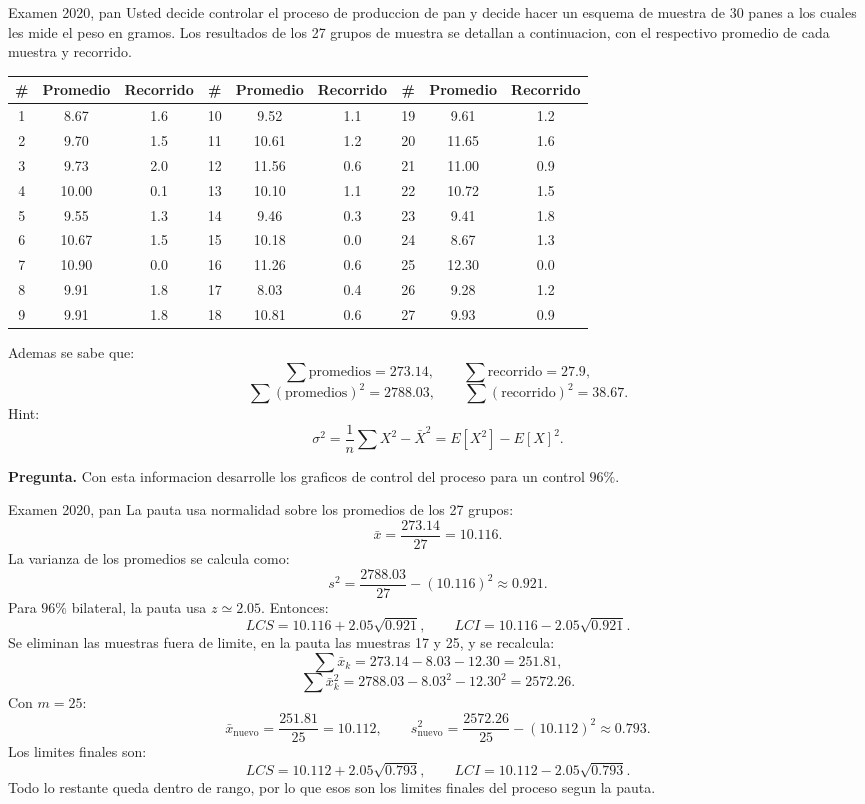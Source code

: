 \begin{enunciado}{Examen 2020, pan}
Usted decide controlar el proceso de produccion de pan y decide hacer un esquema de muestra de 30 panes a los cuales les mide el peso en gramos. Los resultados de los 27 grupos de muestra se detallan a continuacion, con el respectivo promedio de cada muestra y recorrido.

\begin{center}
\small
\begin{tabular}{c|cc@{\hspace{1.0em}}c|cc@{\hspace{1.0em}}c|cc}
\toprule
\# & Promedio & Recorrido & \# & Promedio & Recorrido & \# & Promedio & Recorrido\\
\midrule
1 & 8.67 & 1.6 & 10 & 9.52 & 1.1 & 19 & 9.61 & 1.2\\
2 & 9.70 & 1.5 & 11 & 10.61 & 1.2 & 20 & 11.65 & 1.6\\
3 & 9.73 & 2.0 & 12 & 11.56 & 0.6 & 21 & 11.00 & 0.9\\
4 & 10.00 & 0.1 & 13 & 10.10 & 1.1 & 22 & 10.72 & 1.5\\
5 & 9.55 & 1.3 & 14 & 9.46 & 0.3 & 23 & 9.41 & 1.8\\
6 & 10.67 & 1.5 & 15 & 10.18 & 0.0 & 24 & 8.67 & 1.3\\
7 & 10.90 & 0.0 & 16 & 11.26 & 0.6 & 25 & 12.30 & 0.0\\
8 & 9.91 & 1.8 & 17 & 8.03 & 0.4 & 26 & 9.28 & 1.2\\
9 & 9.91 & 1.8 & 18 & 10.81 & 0.6 & 27 & 9.93 & 0.9\\
\bottomrule
\end{tabular}
\end{center}

Ademas se sabe que:
\[
  \sum \text{promedios}=273.14,\qquad
  \sum \text{recorrido}=27.9,
\]
\[
  \sum(\text{promedios})^2=2788.03,\qquad
  \sum(\text{recorrido})^2=38.67.
\]
Hint:
\[
  \sigma^2=\frac{1}{n}\sum X^2-\bar X^2=E[X^2]-E[X]^2.
\]

\textbf{Pregunta.} Con esta informacion desarrolle los graficos de control del proceso para un control $96\%$.
\end{enunciado}

\begin{pautacompleta}{Examen 2020, pan}
La pauta usa normalidad sobre los promedios de los 27 grupos:
\[
  \bar x=\frac{273.14}{27}=10.116.
\]
La varianza de los promedios se calcula como:
\[
  s^2=\frac{2788.03}{27}-(10.116)^2\approx 0.921.
\]
Para $96\%$ bilateral, la pauta usa $z\simeq 2.05$. Entonces:
\[
  LCS=10.116+2.05\sqrt{0.921},\qquad
  LCI=10.116-2.05\sqrt{0.921}.
\]
Se eliminan las muestras fuera de limite, en la pauta las muestras 17 y 25, y se recalcula:
\[
  \sum \bar x_k=273.14-8.03-12.30=251.81,
\]
\[
  \sum \bar x_k^2=2788.03-8.03^2-12.30^2=2572.26.
\]
Con $m=25$:
\[
  \bar x_{\text{nuevo}}=\frac{251.81}{25}=10.112,\qquad
  s^2_{\text{nuevo}}=\frac{2572.26}{25}-(10.112)^2\approx 0.793.
\]
Los limites finales son:
\[
  LCS=10.112+2.05\sqrt{0.793},\qquad
  LCI=10.112-2.05\sqrt{0.793}.
\]
Todo lo restante queda dentro de rango, por lo que esos son los limites finales del proceso segun la pauta.
\end{pautacompleta}

